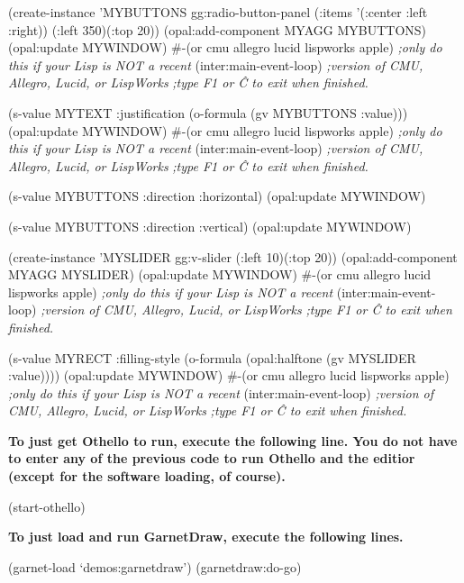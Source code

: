 \begin{programexample}
(create-instance 'MYBUTTONS gg:radio-button-panel
  (:items '(:center :left :right))
  (:left 350)(:top 20))
(opal:add-component MYAGG MYBUTTONS)
(opal:update MYWINDOW)
\#-(or cmu allegro lucid lispworks apple)  {\it ;only do this if your Lisp is NOT a recent}
(inter:main-event-loop)                   {\it ;version of CMU, Allegro, Lucid, or LispWorks}
                                          {\it ;type F1 or \^C to exit when finished.}

(s-value MYTEXT :justification (o-formula (gv MYBUTTONS :value)))
(opal:update MYWINDOW)
\#-(or cmu allegro lucid lispworks apple)  {\it ;only do this if your Lisp is NOT a recent}
(inter:main-event-loop)                   {\it ;version of CMU, Allegro, Lucid, or LispWorks}
                                          {\it ;type F1 or \^C to exit when finished.}

(s-value MYBUTTONS :direction :horizontal)
(opal:update MYWINDOW)

(s-value MYBUTTONS :direction :vertical)
(opal:update MYWINDOW)

(create-instance 'MYSLIDER gg:v-slider
  (:left 10)(:top 20))
(opal:add-component MYAGG MYSLIDER)
(opal:update MYWINDOW)
\#-(or cmu allegro lucid lispworks apple)  {\it ;only do this if your Lisp is NOT a recent}
(inter:main-event-loop)                   {\it ;version of CMU, Allegro, Lucid, or LispWorks}
                                          {\it ;type F1 or \^C to exit when finished.}

(s-value MYRECT :filling-style (o-formula
				(opal:halftone (gv MYSLIDER :value))))
(opal:update MYWINDOW)
\#-(or cmu allegro lucid lispworks apple)  {\it ;only do this if your Lisp is NOT a recent}
(inter:main-event-loop)                   {\it ;version of CMU, Allegro, Lucid, or LispWorks}
                                          {\it ;type F1 or \^C to exit when finished.}
\end{programexample}

{\bf To just get Othello to run, execute the following line.
You do not have to enter any of the previous code to run Othello and
the editior (except for the software loading, of course).}
\begin{programexample}

(start-othello)

\end{programexample}


{\bf To just load and run GarnetDraw, execute the following lines.}

\begin{programexample}

(garnet-load `demos:garnetdraw')
(garnetdraw:do-go)

\end{programexample}

